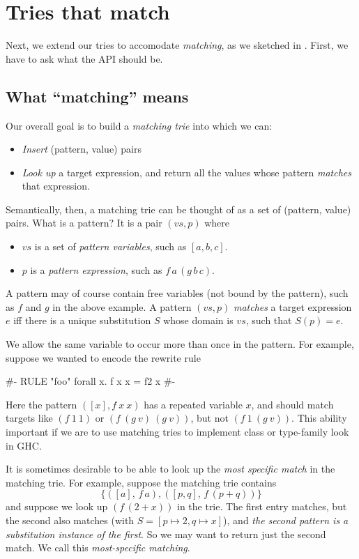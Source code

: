 \documentclass[acmsmall]{acmart}
\theoremstyle{theorem}
\theoremstyle{definition}
\theoremstyle{remark}
\begin{document}
\section{Tries that match}

Next, we extend our tries to accomodate \emph{matching}, as we sketched in
.  First, we have to ask what the API should be.

\subsection{What ``matching'' means}

Our overall goal is to build a \emph{matching trie} into which we can:
\begin{itemize}
\item \emph{Insert} (pattern, value) pairs
\item \emph{Look up} a target expression, and return all the values whose pattern \emph{matches} that expression.
\end{itemize}
Semantically, then, a matching trie can be thought of as a set of (pattern, value) pairs.
What is a pattern? It is a pair $(vs,p)$ where
\begin{itemize}
\item $vs$ is a set of \emph{pattern variables}, such as $[a,b,c]$.
\item $p$ is a \emph{pattern expression}, such as $f\, a\, (g\, b\, c)$.
\end{itemize}
A pattern may of course contain free variables (not bound by the pattern), such as $f$ and $g$
in the above example.
A pattern $(vs, p)$ \emph{matches} a target expression $e$ iff there is a unique substitution
$S$ whose domain is $vs$, such that $S(p) = e$.

We allow the same variable to occur more than once in the pattern.
For example, suppose we wanted to encode the rewrite rule
\begin{code}
{#- RULE "foo" forall x. f x x = f2 x #-}
\end{code}
Here the pattern $([x], f~ x~ x)$ has a repeated variable $x$,
and should match targets like $(f~ 1~ 1)$ or $(f ~(g~ v)~ (g ~v))$,
but not $(f~ 1~ (g~ v))$.  This ability important if we are to use matching tries
to implement class or type-family look in GHC.

It is sometimes desirable to be able to look up the \emph{most specific match} in the matching trie.  For example, suppose the matching trie contains
$$
\{ ([a],\, f\, a), ([p,q],\, f\,(p+q)) \}
$$
and suppose we look up $(f\,(2+x))$ in the trie.  The first entry matches, but the second also matches (with $S = [p \mapsto 2, q \mapsto x]$), and \emph{the second pattern is a substitution instance of the first}.  So we may want to return just the second match.  We call this \emph{most-specific matching}.
\end{document}
